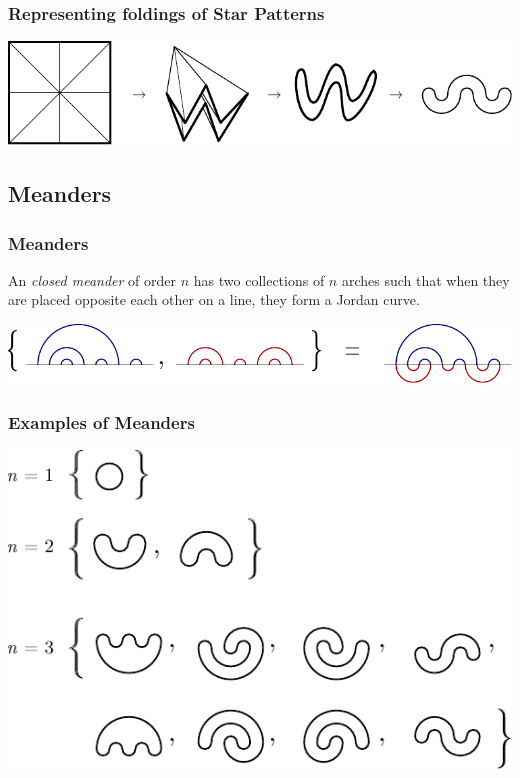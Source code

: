 \documentclass{beamer}
\begin{document}
\begin{frame}
\frametitle{Representing foldings of Star Patterns}
\pause
\begin{center}
\includegraphics[width=\textwidth]{meanders/star-to-meander.pdf}
\end{center}
\end{frame}

\subsection{Meanders}
\begin{frame}
\frametitle{Meanders}
\begin{definition}
An \emph{closed meander} of order $n$ has two collections of $n$ arches such that when they are placed opposite each other on a line, they form a Jordan curve.
\end{definition}
\begin{center}
\includegraphics[width=.8\textwidth]{meanders/meander-defn.pdf}
\end{center}
\end{frame}

\begin{frame}
\frametitle{Examples of Meanders}
\begin{center}
\includegraphics[width=.8\textwidth]{meanders/12-and-3.pdf}
\end{center}

\end{frame}
\end{document}
